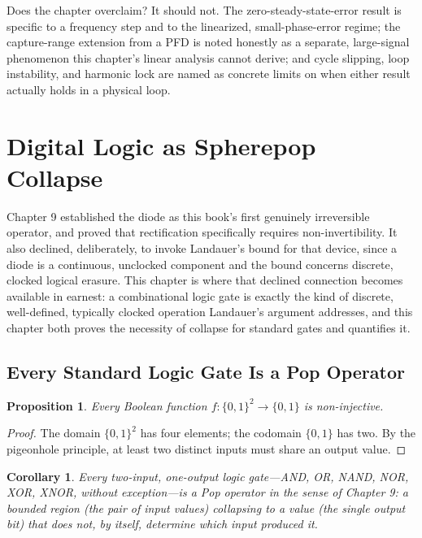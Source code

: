 \documentclass[12pt]{article}
\newtheorem{proposition}{Proposition}
\newtheorem{corollary}{Corollary}
\begin{document}
Does the chapter overclaim? It should not. The zero-steady-state-error result is specific to a frequency step and to the linearized, small-phase-error regime; the capture-range extension from a PFD is noted honestly as a separate, large-signal phenomenon this chapter's linear analysis cannot derive; and cycle slipping, loop instability, and harmonic lock are named as concrete limits on when either result actually holds in a physical loop.

\section{Digital Logic as Spherepop Collapse}

Chapter 9 established the diode as this book's first genuinely irreversible operator, and proved that rectification specifically requires non-invertibility. It also declined, deliberately, to invoke Landauer's bound for that device, since a diode is a continuous, unclocked component and the bound concerns discrete, clocked logical erasure. This chapter is where that declined connection becomes available in earnest: a combinational logic gate is exactly the kind of discrete, well-defined, typically clocked operation Landauer's argument addresses, and this chapter both proves the necessity of collapse for standard gates and quantifies it.

\subsection{Every Standard Logic Gate Is a Pop Operator}

\begin{proposition}
Every Boolean function $f: \{0,1\}^2 \to \{0,1\}$ is non-injective.
\end{proposition}

\begin{proof}
The domain $\{0,1\}^2$ has four elements; the codomain $\{0,1\}$ has two. By the pigeonhole principle, at least two distinct inputs must share an output value.
\end{proof}

\begin{corollary}
Every two-input, one-output logic gate---AND, OR, NAND, NOR, XOR, XNOR, without exception---is a Pop operator in the sense of Chapter 9: a bounded region (the pair of input values) collapsing to a value (the single output bit) that does not, by itself, determine which input produced it.
\end{corollary}
\end{document}
